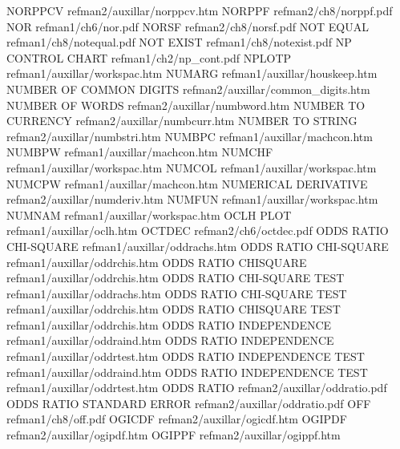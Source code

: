 NORPPCV                                 refman2/auxillar/norppcv.htm
NORPPF                                  refman2/ch8/norppf.pdf
NOR                                     refman1/ch6/nor.pdf
NORSF                                   refman2/ch8/norsf.pdf
NOT EQUAL                               refman1/ch8/notequal.pdf
NOT EXIST                               refman1/ch8/notexist.pdf
NP CONTROL CHART                        refman1/ch2/np_cont.pdf
NPLOTP                                  refman1/auxillar/workspac.htm
NUMARG                                  refman1/auxillar/houskeep.htm
NUMBER OF COMMON DIGITS                 refman2/auxillar/common_digits.htm
NUMBER OF WORDS                         refman2/auxillar/numbword.htm
NUMBER TO CURRENCY                      refman2/auxillar/numbcurr.htm
NUMBER TO STRING                        refman2/auxillar/numbstri.htm
NUMBPC                                  refman1/auxillar/machcon.htm
NUMBPW                                  refman1/auxillar/machcon.htm
NUMCHF                                  refman1/auxillar/workspac.htm
NUMCOL                                  refman1/auxillar/workspac.htm
NUMCPW                                  refman1/auxillar/machcon.htm
NUMERICAL DERIVATIVE                    refman2/auxillar/numderiv.htm
NUMFUN                                  refman1/auxillar/workspac.htm
NUMNAM                                  refman1/auxillar/workspac.htm
OCLH PLOT                               refman1/auxillar/oclh.htm
OCTDEC                                  refman2/ch6/octdec.pdf
ODDS RATIO CHI-SQUARE                   refman1/auxillar/oddrachs.htm
ODDS RATIO CHI-SQUARE                   refman1/auxillar/oddrchis.htm
ODDS RATIO CHISQUARE                    refman1/auxillar/oddrchis.htm
ODDS RATIO CHI-SQUARE TEST              refman1/auxillar/oddrachs.htm
ODDS RATIO CHI-SQUARE TEST              refman1/auxillar/oddrchis.htm
ODDS RATIO CHISQUARE TEST               refman1/auxillar/oddrchis.htm
ODDS RATIO INDEPENDENCE                 refman1/auxillar/oddraind.htm
ODDS RATIO INDEPENDENCE                 refman1/auxillar/oddrtest.htm
ODDS RATIO INDEPENDENCE TEST            refman1/auxillar/oddraind.htm
ODDS RATIO INDEPENDENCE TEST            refman1/auxillar/oddrtest.htm
ODDS RATIO                              refman2/auxillar/oddratio.pdf
ODDS RATIO STANDARD ERROR               refman2/auxillar/oddratio.pdf
OFF                                     refman1/ch8/off.pdf
OGICDF                                  refman2/auxillar/ogicdf.htm
OGIPDF                                  refman2/auxillar/ogipdf.htm
OGIPPF                                  refman2/auxillar/ogippf.htm
